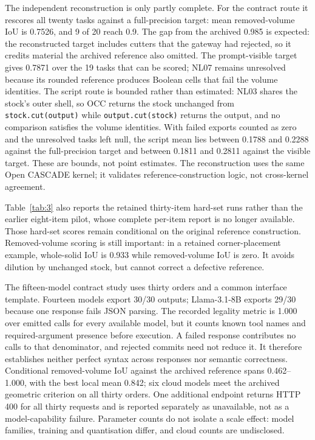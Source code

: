 The independent reconstruction is only partly complete. For the contract route it rescores all twenty tasks against a full-precision target: mean removed-volume IoU is 0.7526, and 9 of 20 reach 0.9. The gap from the archived 0.985 is expected: the reconstructed target includes cutters that the gateway had rejected, so it credits material the archived reference also omitted. The prompt-visible target gives 0.7871 over the 19 tasks that can be scored; NL07 remains unresolved because its rounded reference produces Boolean cells that fail the volume identities. The script route is bounded rather than estimated: NL03 shares the stock's outer shell, so OCC returns the stock unchanged from \texttt{stock.cut(output)} while \texttt{output.cut(stock)} returns the output, and no comparison satisfies the volume identities. With failed exports counted as zero and the unresolved tasks left null, the script mean lies between 0.1788 and 0.2288 against the full-precision target and between 0.1811 and 0.2811 against the visible target. These are bounds, not point estimates. The reconstruction uses the same Open CASCADE kernel; it validates reference-construction logic, not cross-kernel agreement.

Table~\ref{tab:3} also reports the retained thirty-item hard-set runs rather than the earlier eight-item pilot, whose complete per-item report is no longer available. Those hard-set scores remain conditional on the original reference construction. Removed-volume scoring is still important: in a retained corner-placement example, whole-solid IoU is 0.933 while removed-volume IoU is zero. It avoids dilution by unchanged stock, but cannot correct a defective reference.

The fifteen-model contract study uses thirty orders and a common interface template. Fourteen models export 30/30 outputs; Llama-3.1-8B exports 29/30 because one response fails JSON parsing. The recorded legality metric is 1.000 over emitted calls for every available model, but it counts known tool names and required-argument presence before execution. A failed response contributes no calls to that denominator, and rejected commits need not reduce it. It therefore establishes neither perfect syntax across responses nor semantic correctness. Conditional removed-volume IoU against the archived reference spans 0.462--1.000, with the best local mean 0.842; six cloud models meet the archived geometric criterion on all thirty orders. One additional endpoint returns HTTP 400 for all thirty requests and is reported separately as unavailable, not as a model-capability failure. Parameter counts do not isolate a scale effect: model families, training and quantisation differ, and cloud counts are undisclosed.

